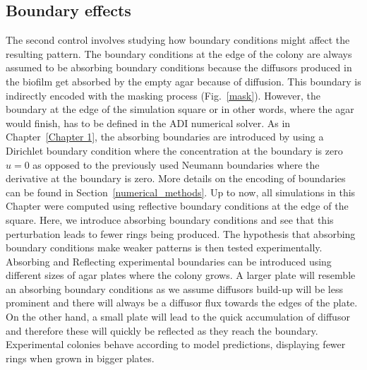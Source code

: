\subsection{Boundary effects}
The second control involves studying how boundary conditions might affect the resulting pattern.
The boundary conditions at the edge of the colony are always assumed to be absorbing boundary conditions because the diffusors produced in the biofilm get absorbed by the empty agar because of diffusion.
This boundary is indirectly encoded with the masking process (Fig.~\ref{mask}).
However, the boundary at the edge of the simulation square or in other words, where the agar would finish, has to be defined in the ADI numerical solver.
As in Chapter~\ref{Chapter 1}, the absorbing boundaries are introduced by using a Dirichlet boundary condition where the concentration at the boundary is zero $u=0$ as opposed to the previously used Neumann boundaries where the derivative at the boundary is zero.
More details on the encoding of boundaries can be found in Section~\ref{numerical_methods}.
Up to now, all simulations in this Chapter were computed using reflective boundary conditions at the edge of the square.
Here, we introduce absorbing boundary conditions and see that this perturbation leads to fewer rings being produced.
The hypothesis that absorbing boundary conditions make weaker patterns is then tested experimentally.
Absorbing and Reflecting experimental boundaries can be introduced using different sizes of agar plates where the colony grows.
A larger plate will resemble an absorbing boundary conditions as we assume diffusors build-up will be less prominent and there will always be a diffusor flux towards the edges of the plate.
On the other hand, a small plate will lead to the quick accumulation of diffusor and therefore these will quickly be reflected as they reach the boundary. %
Experimental colonies behave according to model predictions, displaying fewer rings when grown in bigger plates.


